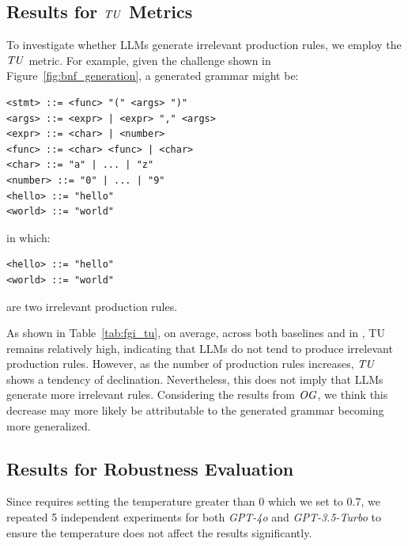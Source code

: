 \subsection{Results for $\mathit{TU}$ Metrics}
\label{appendix:tu_results}
To investigate whether LLMs generate irrelevant production rules, we employ the $\mathit{TU}$ metric. For example, given the challenge shown in Figure~\ref{fig:bnf_generation}, a generated grammar might be:

\vspace{1em}
\begin{minipage}{\linewidth}
\begin{verbatim}
<stmt> ::= <func> "(" <args> ")"
<args> ::= <expr> | <expr> "," <args>
<expr> ::= <char> | <number>
<func> ::= <char> <func> | <char>
<char> ::= "a" | ... | "z"
<number> ::= "0" | ... | "9"
<hello> ::= "hello"
<world> ::= "world"

\end{verbatim}
\end{minipage}
\vspace{1em}
in which:

\vspace{1em}
\begin{minipage}{\linewidth}
\begin{verbatim}
<hello> ::= "hello"
<world> ::= "world"

\end{verbatim}
\end{minipage} 
\vspace{1em}
are two irrelevant production rules.

As shown in Table~\ref{tab:fgi_tu}, on average, across both baselines and in \NAME, TU remains relatively high, indicating that LLMs do not tend to produce irrelevant production rules. However, as the number of production rules increases, $\mathit{TU}$ shows a tendency of declination. Nevertheless, this does not imply that LLMs generate more irrelevant rules. Considering the results from $\mathit{OG}$, we think this decrease may more likely be attributable to the generated grammar becoming more generalized.

\subsection{Results for Robustness Evaluation}
\label{appendix:multiple_experiments}

Since \NAME requires setting the temperature greater than 0 which we set to 0.7, we repeated 5 independent experiments for both \textit{GPT-4o} and \textit{GPT-3.5-Turbo} to ensure the temperature does not affect the results significantly.

